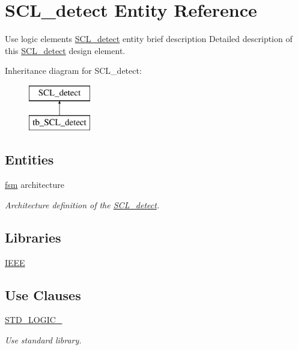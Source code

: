 \hypertarget{class_s_c_l__detect}{}\section{S\+C\+L\+\_\+detect Entity Reference}
\label{class_s_c_l__detect}


Use logic elements \hyperlink{class_s_c_l__detect}{S\+C\+L\+\_\+detect} entity brief description Detailed description of this \hyperlink{class_s_c_l__detect}{S\+C\+L\+\_\+detect} design element.  


Inheritance diagram for S\+C\+L\+\_\+detect\+:\begin{figure}[H]
\begin{center}
\leavevmode
\includegraphics[height=2.000000cm]{class_s_c_l__detect}
\end{center}
\end{figure}
\subsection*{Entities}
\begin{DoxyCompactItemize}
\item 
\hyperlink{class_s_c_l__detect_1_1fsm}{fsm} architecture
\begin{DoxyCompactList}\small\item\em Architecture definition of the \hyperlink{class_s_c_l__detect}{S\+C\+L\+\_\+detect}. \end{DoxyCompactList}\end{DoxyCompactItemize}
\subsection*{Libraries}
 \begin{DoxyCompactItemize}
\item 
\hyperlink{class_s_c_l__detect_ae4f03c286607f3181e16b9aa12d0c6d4}{I\+E\+EE} 
\end{DoxyCompactItemize}
\subsection*{Use Clauses}
 \begin{DoxyCompactItemize}
\item 
\hyperlink{class_s_c_l__detect_aa4b2b25246a821511120e3149b003563}{S\+T\+D\+\_\+\+L\+O\+G\+I\+C\+\_}   \hypertarget{class_s_c_l__detect_aa4b2b25246a821511120e3149b003563}{}\label{class_s_c_l__detect_aa4b2b25246a821511120e3149b003563}

\begin{DoxyCompactList}\small\item\em Use standard library. \end{DoxyCompactList}\end{DoxyCompactItemize}
